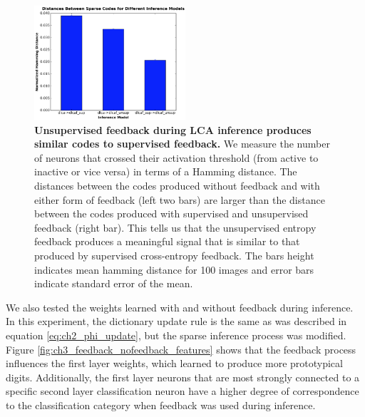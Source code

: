 \begin{figure}
    \centering
    \includegraphics[width=0.5\textwidth]{figures/feedback_code_distances.png}
    \caption{\textbf{Unsupervised feedback during LCA inference produces similar codes to supervised feedback.} We measure the number of neurons that crossed their activation threshold (from active to inactive or vice versa) in terms of a Hamming distance. The distances between the codes produced without feedback and with either form of feedback (left two bars) are larger than the distance between the codes produced with supervised and unsupervised feedback (right bar). This tells us that the unsupervised entropy feedback produces a meaningful signal that is similar to that produced by supervised cross-entropy feedback. The bars height indicates mean hamming distance for 100 images and error bars indicate standard error of the mean.}
    \label{fig:ch3_feedback_code_distances}
\end{figure}

We also tested the weights learned with and without feedback during inference. In this experiment, the dictionary update rule is the same as was described in equation \eqref{eq:ch2_phi_update}, but the sparse inference process was modified. Figure \ref{fig:ch3_feedback_nofeedback_features} shows that the feedback process influences the first layer weights, which learned to produce more prototypical digits. Additionally, the first layer neurons that are most strongly connected to a specific second layer classification neuron have a higher degree of correspondence to the classification category when feedback was used during inference.

